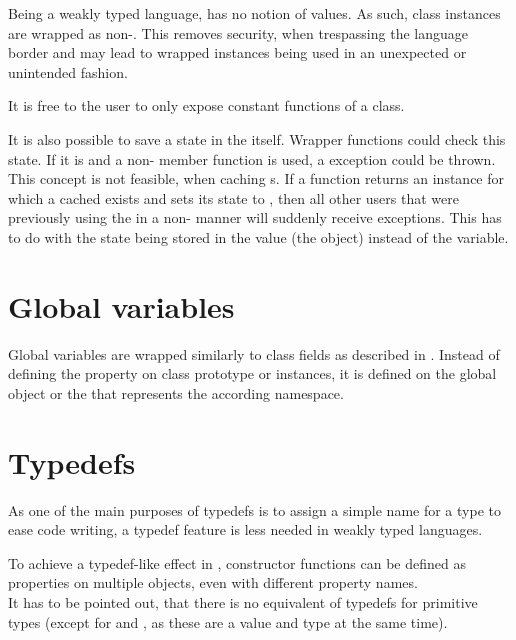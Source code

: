 Being a weakly typed language,  has no notion of  values. As such,  class instances are wrapped as non-. This removes security, when trespassing the language border and may lead to wrapped instances being used in an unexpected or unintended fashion.

It is free to the  user to only expose constant functions of a class.

It is also possible to save a  state in the  itself. Wrapper functions could check this state. If it is  and a non- member function is used, a  exception could be thrown.\\
This concept is not feasible, when caching s. If a  function returns an instance for which a cached  exists and sets its  state to , then all other users that were previously using the  in a non- manner will suddenly receive exceptions. This has to do with the  state being stored in the value (the object) instead of the variable.

\section{Global variables}

Global variables are wrapped similarly to class fields as described in . Instead of defining the property on class prototype or instances, it is defined on the global  object or the  that represents the according namespace.

\section{Typedefs}

As one of the main purposes of typedefs is to assign a simple name for a  type to ease code writing, a typedef feature is less needed in weakly typed languages.

To achieve a typedef-like effect in , constructor functions can be defined as properties on multiple objects, even with different property names.\\
It has to be pointed out, that there is no equivalent of typedefs for primitive types (except for  and , as these are a value and type at the same time).

